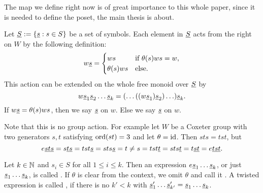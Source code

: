 The map we define right now is of great importance to this whole paper, since it is needed to define the poset, the main thesis is about.

\begin{defi}
	Let $\underline{S} := \{ \underline{s} : s \in S \}$ be a set of symbols. Each element in $\underline{S}$ acts from the right on $W$ by the following definition:
	$$ w \underline{s} = \begin{cases}
		ws & \textrm{if } \theta(s)ws = w, \\
		\theta(s)ws & \textrm{else}. \\
	\end{cases} $$
	This action can be extended on the whole free monoid over $\underline{S}$ by
	$$ w \underline{s}_1 \underline{s}_2 \ldots \underline{s}_k = (\ldots ((w \underline{s}_1) \underline{s}_2) \ldots) \underline{s}_k. $$
	If $w \underline{s} = \theta(s)ws$, then we say $\underline{s}$  on $w$. Else we say $\underline{s}$  on $w$.
\end{defi}

Note that this is no group action. For example let $W$ be a Coxeter group with two generators $s,t$ satisfying $\operatorname{ord}(st) = 3$ and let $\theta = \operatorname{id}$. Then $sts = tst$, but
$$ e \underline{s} \underline{t} \underline{s} = s \underline{t} \underline{s} = tst \underline{s} = sts \underline{s} = t \neq s = tst \underline{t} = sts \underline{t} = t \underline{s} \underline{t} = e \underline{t} \underline{s} \underline{t}. $$

\begin{defi}
	Let $k \in \mathbb{N}$ and $s_{i} \in S$ for all $1 \leq i \leq k$. Then an expression $e \underline{s}_1 \ldots \underline{s}_k$, or just $\underline{s}_1 \ldots \underline{s}_k$, is called . If $\theta$ is clear from the context, we omit $\theta$ and call it . A twisted expression is called , if there is no $k' < k$ with $\underline{s}'_1 \ldots \underline{s}'_{k'} = \underline{s}_1 \ldots \underline{s}_k$.
\end{defi}

